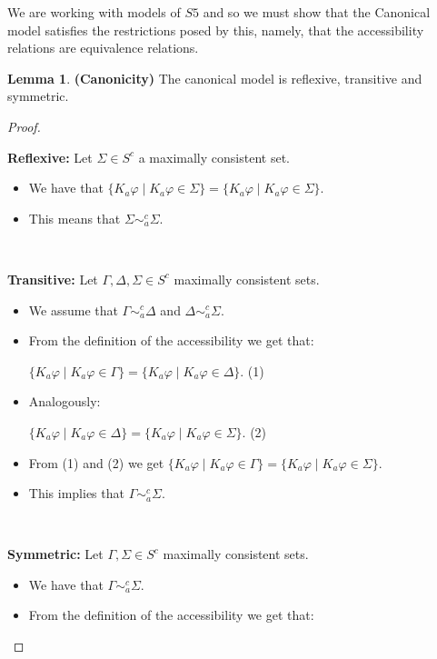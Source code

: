 \documentclass[12pt]{article}
\numberwithin{equation}{section}
\theoremstyle{definition}
\newtheorem{lem}[thm]{Lemma}
\theoremstyle{definition}
\theoremstyle{remark}
\begin{document}
We are working with models of $S5$ and so we must show that the Canonical model satisfies the restrictions posed by this, namely, that the accessibility relations are equivalence relations.

\begin{lem}
\textbf{(Canonicity)}
The canonical model is reflexive, transitive and symmetric.
\end{lem}

\begin{proof}

~

\textbf{Reflexive:}
Let $\Sigma \in S^c$ a maximally consistent set.
\begin{itemize}

\item We have that $\{ K_a \varphi \mid K_a \varphi \in \Sigma \} = \{ K_a \varphi \mid K_a \varphi \in \Sigma \} $.

\item This means that $\Sigma \sim^c_a \Sigma$.
\end{itemize}
~

\textbf{Transitive:}
Let $\Gamma, \Delta, \Sigma \in S^c$ maximally consistent sets.
\begin{itemize}
\item We assume that $\Gamma \sim^c_a \Delta$ and $\Delta \sim^c_a \Sigma$.
\item From the definition of the accessibility we get that:

$\{ K_a \varphi \mid K_a \varphi \in \Gamma \} = \{ K_a \varphi \mid K_a \varphi \in \Delta \}$. (1)

\item Analogously:

$\{ K_a \varphi \mid K_a \varphi \in \Delta \} = \{ K_a \varphi \mid K_a \varphi \in \Sigma \}$. (2)

\item From (1) and (2) we get $\{ K_a \varphi \mid K_a \varphi \in \Gamma \} = \{ K_a \varphi \mid K_a \varphi \in \Sigma \}$.

\item This implies that $\Gamma \sim^c_a \Sigma$.
\end{itemize}
~

\textbf{Symmetric:}
Let $\Gamma, \Sigma \in S^c$ maximally consistent sets.
\begin{itemize}
\item We have that $\Gamma \sim^c_a \Sigma$.

\item From the definition of the accessibility we get that:


\end{itemize}
\end{proof}
\end{document}

